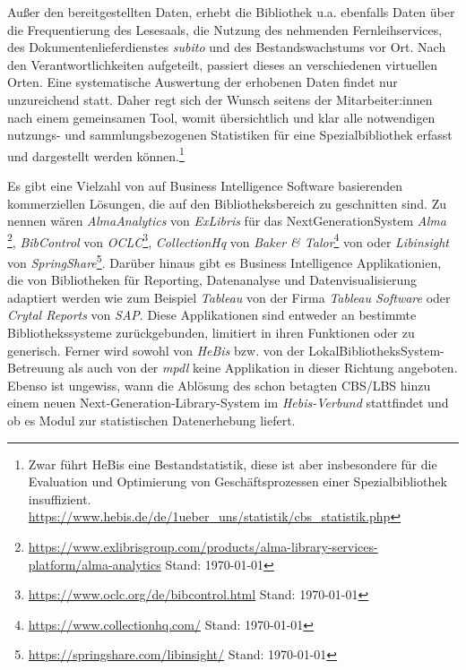 \documentclass[10pt,a4paper,twocolumn,conference]{IEEEtran}
\begin{document}
Außer den bereitgestellten Daten, erhebt die Bibliothek u.a. ebenfalls Daten über
die Frequentierung des Lesesaals, die Nutzung des nehmenden Fernleihservices, des
Dokumentenlieferdienstes \textit{subito} und des Bestandswachstums vor Ort.
Nach den Verantwortlichkeiten aufgeteilt, passiert dieses an verschiedenen virtuellen Orten. 
Eine systematische Auswertung der erhobenen Daten findet nur unzureichend statt. 
Daher regt sich der Wunsch seitens der Mitarbeiter:innen nach einem gemeinsamen Tool, 
womit übersichtlich und klar alle notwendigen nutzungs- und sammlungsbezogenen Statistiken für eine 
Spezialbibliothek erfasst und dargestellt werden können.\footnote{Zwar führt HeBis eine Bestandstatistik, diese ist aber insbesondere für die
Evaluation und Optimierung von Geschäftsprozessen einer Spezialbibliothek
insuffizient. \url{https://www.hebis.de/de/1ueber_uns/statistik/cbs_statistik.php}}

Es gibt eine Vielzahl von auf Business Intelligence Software basierenden
kommerziellen Lösungen, die auf den Bibliotheksbereich zu geschnitten sind. 
Zu nennen wären \textit{AlmaAnalytics} von \textit{ExLibris} für das
NextGenerationSystem \textit{Alma} 
\footnote{\url{https://www.exlibrisgroup.com/products/alma-library-services-platform/alma-analytics}
Stand: \today},
\textit{BibControl} von \textit{OCLC}\footnote{\url{https://www.oclc.org/de/bibcontrol.html} Stand: \today},
\textit{CollectionHq} von \textit{Baker \& Talor}\footnote{\url{https://www.collectionhq.com/} Stand: \today} von
oder \textit{Libinsight} von \textit{SpringShare}\footnote{\url{https://springshare.com/libinsight/} Stand: \today}.
Darüber hinaus gibt es Business Intelligence Applikationien, die von
Bibliotheken für Reporting, Datenanalyse und Datenvisualisierung adaptiert werden
wie zum Beispiel \textit{Tableau} von der Firma \textit{Tableau Software} oder
\textit{Crytal Reports} von \textit{SAP}.
Diese Applikationen sind entweder 
an bestimmte Bibliothekssysteme zurückgebunden, limitiert in ihren
Funktionen\cite{RN47} oder zu generisch.
Ferner wird sowohl von \textit{HeBis} bzw. von der
LokalBibliotheksSystem-Betreuung als auch von der \textit{mpdl} keine Applikation
in dieser Richtung angeboten.
Ebenso ist ungewiss, wann die Ablösung des schon betagten CBS/LBS hinzu
einem neuen Next-Generation-Library-System im \textit{Hebis-Verbund} stattfindet und ob
es Modul zur statistischen Datenerhebung liefert.



\end{document}
